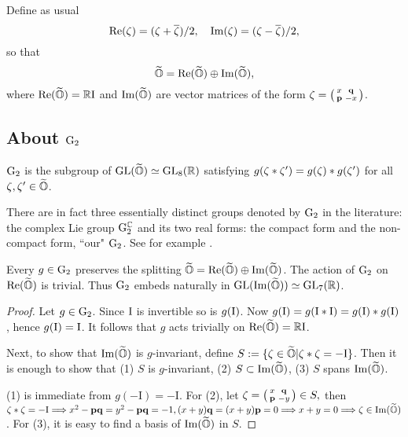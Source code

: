 Define as usual $${\rm Re}(\zeta)=(\zeta+\overline{\zeta})/2, \quad {\rm Im}(\zeta)=(\zeta-\overline{\zeta})/2, $$
so that $$\widetilde{\mathbb O}={\rm Re}(\widetilde{\mathbb O})\oplus{\rm Im}(\widetilde{\mathbb O}),$$ where 
${\rm Re}(\widetilde{\mathbb O})=\mathbb{R}\rm I$ and ${\rm Im}(\widetilde{\mathbb O})$ are vector matrices of the form $\zeta=\left(\begin{smallmatrix}x&\mathbf q \\ {\mathbf p}&-x\end{smallmatrix}\right)$. 


\subsection{About ${\rm G}_2$}




\begin{definition} ${\rm G}_2$  is the subgroup of $\mathrm{GL}(\widetilde{\mathbb O})\simeq \mathrm{GL}_8(\mathbb{R})$ satisfying
 $g(\zeta\ast\zeta')=g(\zeta)\ast g(\zeta')$ for all $\zeta, \zeta'\in\widetilde{\mathbb O}$. 
 \end{definition}
 
 
 
 \begin{rmrk} There are in fact three essentially distinct groups denoted by ${\rm G}_2$ in the literature: the  complex  Lie group ${\rm G}_2^{\mathbb{C}}$
  and its two real forms: the  compact form %
 and the  non-compact form, ``our" ${\rm G}_2$. See for example \cite{KN}. 
 \end{rmrk}
 \begin{proposition} Every  $g\in{\rm G}_2$ preserves the splitting $\widetilde{\mathbb O}={\rm Re}(\widetilde{\mathbb O})\oplus{\rm Im}(\widetilde{\mathbb O})$. The action of ${\rm G}_2$ on ${\rm Re}(\widetilde{\mathbb O})$ is trivial. Thus  ${\rm G}_2$ embeds naturally  in $\mathrm{GL}({\rm Im}(\widetilde{\mathbb O}))\simeq \mathrm{GL}_7(\mathbb{R})$. 
 
 \end{proposition}
 
\begin{proof} Let $g\in{\rm G}_2$. Since $\rm I$ is invertible so is $g(\rm I)$. 
 Now $g({\rm I})=g({\rm I}\ast{\rm I} )=g({\rm I})\ast g({\rm I})$, hence $g({\rm I})={\rm I}$. 
 It follows that $g$ acts trivially on ${\rm Re}(\widetilde{\mathbb O})=\mathbb{R}\rm I$. 
 
  
Next,  to show that ${\rm Im}(\widetilde{\mathbb O})$ is $g$-invariant, define $S:= \{\zeta\in\widetilde{\mathbb O}|\zeta\ast\zeta=-\rm I\}$.
 Then it is enough to show that  (1) $S$ is $g$-invariant, 
 (2)  $S\subset {\rm Im}(\widetilde{\mathbb O})$, 
 (3) $S$ spans ${\rm Im}(\widetilde{\mathbb O})$. 

(1) is immediate from $g(-\mathrm I)=-\mathrm I.$ For (2),  let  $\zeta=\left(\begin{smallmatrix}x&\mathbf q \\ {\mathbf p}&-y\end{smallmatrix}\right)\in S,$ 
then $\zeta*\zeta=-{\rm I}\Longrightarrow x^2-{\mathbf p}\mathbf q=y^2-{\mathbf p}\mathbf q=-1,  (x+y)\mathbf q=(x+y){\mathbf p}=0\Longrightarrow x+y=0\Longrightarrow \zeta\in{\rm Im}(\widetilde{\mathbb O})$. For (3), it is easy to find a basis of ${\rm Im}(\widetilde{\mathbb O})$ in $S$.
\end{proof}

